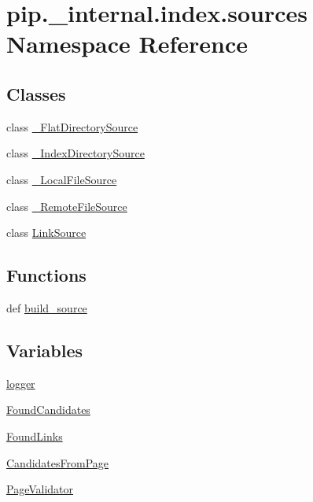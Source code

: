 \hypertarget{namespacepip_1_1__internal_1_1index_1_1sources}{}\section{pip.\+\_\+internal.\+index.\+sources Namespace Reference}
\label{namespacepip_1_1__internal_1_1index_1_1sources}
\subsection*{Classes}
\begin{DoxyCompactItemize}
\item 
class \hyperlink{classpip_1_1__internal_1_1index_1_1sources_1_1__FlatDirectorySource}{\+\_\+\+Flat\+Directory\+Source}
\item 
class \hyperlink{classpip_1_1__internal_1_1index_1_1sources_1_1__IndexDirectorySource}{\+\_\+\+Index\+Directory\+Source}
\item 
class \hyperlink{classpip_1_1__internal_1_1index_1_1sources_1_1__LocalFileSource}{\+\_\+\+Local\+File\+Source}
\item 
class \hyperlink{classpip_1_1__internal_1_1index_1_1sources_1_1__RemoteFileSource}{\+\_\+\+Remote\+File\+Source}
\item 
class \hyperlink{classpip_1_1__internal_1_1index_1_1sources_1_1LinkSource}{Link\+Source}
\end{DoxyCompactItemize}
\subsection*{Functions}
\begin{DoxyCompactItemize}
\item 
def \hyperlink{namespacepip_1_1__internal_1_1index_1_1sources_abba5dd102300102de4b9b0ff7d679641}{build\+\_\+source}
\end{DoxyCompactItemize}
\subsection*{Variables}
\begin{DoxyCompactItemize}
\item 
\hyperlink{namespacepip_1_1__internal_1_1index_1_1sources_a7aa91e70f71301e276f024e43982fab5}{logger}
\item 
\hyperlink{namespacepip_1_1__internal_1_1index_1_1sources_a1b1f5d620c539472b38006b0749aa0c2}{Found\+Candidates}
\item 
\hyperlink{namespacepip_1_1__internal_1_1index_1_1sources_a39ba0822c7a6490947cf4a90b65c0159}{Found\+Links}
\item 
\hyperlink{namespacepip_1_1__internal_1_1index_1_1sources_acd21780bb093d0986d8cad8c2aa19ca1}{Candidates\+From\+Page}
\item 
\hyperlink{namespacepip_1_1__internal_1_1index_1_1sources_a5c46d1951f640dfe6d3ca0acc5d8f1e0}{Page\+Validator}
\end{DoxyCompactItemize}


